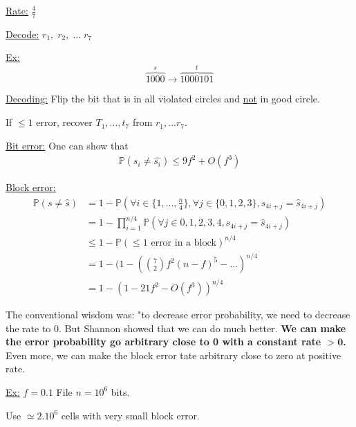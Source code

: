 \underline{Rate:} $\frac{4}{7}$

\underline{Decode:} $r_1,\; r_2,\; ... \; r_7$


\underline{Ex:} 
\begin{equation*}
\overbrace{1000}^s \to \overbrace{1000101}^t
\end{equation*}

\underline{Decoding:} Flip the bit that is in all violated circles and \underline{not} in good circle.

If $\leq 1$ error, recover $T_1,...,t_7$ from $r_1, ... r_7$.

\underline{Bit error:} One can show that 
\begin{align*}
\mathbb{P}(s_i\neq\hat{s_i})\leq 9f^2 + O(f^3)
\end{align*} 

\underline{Block error:}
\begin{align*}
\mathbb{P}(s\neq\hat{s}) & = 1 - \mathbb{P}( \forall i\in \{1,...,\frac{n}{4}\}, \forall j \in \{0,1,2,3\}, s_{4i+j}=\hat{s}_{4i+j}) \\
& = 1 - \prod_{i=1}^{n/4} \mathbb{P} (\forall j \in {0,1,2,3,4}, s_{4i+j} = \hat{s}_{4i+j} )\\
& \leq 1- \mathbb{P}(\leq \text{1 error in a block})^{n/4}\\
& = 1 - (1-\left(\binom{7}{2} f^2 (n-f)^5 - ... \right)^{n/4}\\
& = 1 - (1 -21f^2 - O(f^3))^{n/4}
\end{align*}

The conventional wisdom was: "to decrease error probability, we need to decrease the rate to 0. But Shannon showed that we can do much better. \textbf{We can make the error probability go arbitrary close to 0 with a constant rate $\mathbf{> 0}$.} Even more, we can make the block error tate arbitrary close to zero at positive rate.

\underline{Ex:} $f=0.1$ File $n=10^6$ bits.

Use $\simeq 2. 10^6$ cells with very small block error.